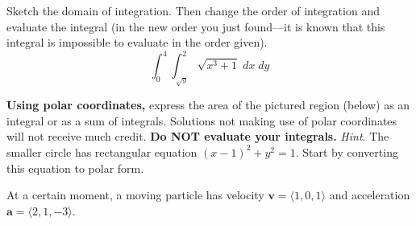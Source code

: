 \documentclass[12pt]{exam}
\renewcommand{\vec}[1]{\mathbf{#1}}
\begin{document}
\begin{questions}
    

    \question[16]
        Sketch the domain of integration. Then change the order of integration and evaluate the integral (in the new order you just found---it is known that this integral is impossible to evaluate in the order given).
        \[
            \int_0^4 \int_{\sqrt{y}}^2 \sqrt{x^3 + 1} \; dx \; dy
        \]

    \question[8] \label{prob:polar}
        \textbf{Using polar coordinates,} express the area of the pictured region (below) as an integral or as a sum of integrals. Solutions not making use of polar coordinates will not receive much credit. \textbf{Do NOT evaluate your integrals.} \emph{Hint}. The smaller circle has rectangular equation $(x-1)^2 + y^2 = 1$. Start by converting this equation to polar form.
        
    \question At a certain moment, a moving particle has velocity $\vec{v} = \langle 1, 0, 1 \rangle$ and acceleration $\vec{a} = \langle 2, 1, -3 \rangle$.


        \end{questions}
\end{document}
